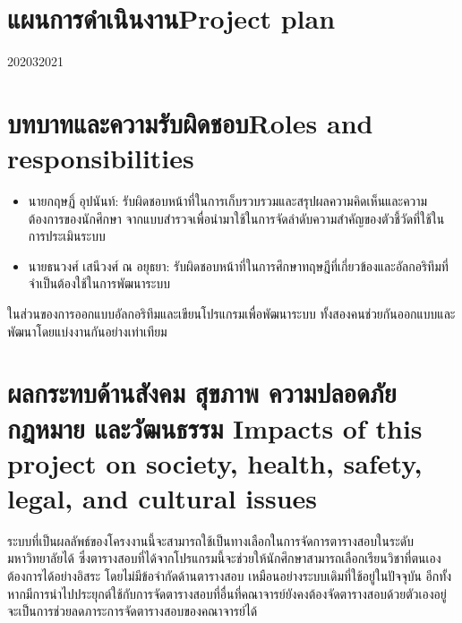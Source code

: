\section{\ifcpe แผนการดำเนินงาน\else Project plan\fi}

\begin{plan}{7}{2020}{3}{2021}
\end{plan}


\section{\ifcpe บทบาทและความรับผิดชอบ\else Roles and responsibilities\fi}
\begin{itemize}
\item นายกฤษฏิ์ อุปนันท์: รับผิดชอบหน้าที่ในการเก็บรวบรวมและสรุปผลความคิดเห็นและความต้องการของนักศึกษา
จากแบบสำรวจเพื่อนำมาใช้ในการจัดลำดับความสำคัญของตัวชี้วัดที่ใช้ในการประเมินระบบ
\item นายธนวงศ์ เสนีวงศ์ ณ อยุธยา: รับผิดชอบหน้าที่ในการศึกษาทฤษฎีที่เกี่ยวข้องและอัลกอริทึมที่จำเป็นต้องใช้ในการพัฒนาระบบ
\end{itemize}

ในส่วนของการออกแบบอัลกอริทึมและเขียนโปรแกรมเพื่อพัฒนาระบบ ทั้งสองคนช่วยกันออกแบบและพัฒนาโดยแบ่งงานกันอย่างเท่าเทียม

\section{\ifcpe%
ผลกระทบด้านสังคม สุขภาพ ความปลอดภัย กฎหมาย และวัฒนธรรม
\else%
Impacts of this project on society, health, safety, legal, and cultural issues
\fi}

ระบบที่เป็นผลลัพธ์ของโครงงานนี้จะสามารถใช้เป็นทางเลือกในการจัดการตารางสอบในระดับมหาวิทยาลัยได้
ซึ่งตารางสอบที่ได้จากโปรแกรมนี้จะช่วยให้นักศึกษาสามารถเลือกเรียนวิชาที่ตนเองต้องการได้อย่างอิสระ โดยไม่มีข้อจำกัดด้านตารางสอบ
เหมือนอย่างระบบเดิมที่ใช้อยู่ในปัจจุบัน อีกทั้งหากมีการนำไปประยุกต์ใช้กับการจัดตารางสอบที่อื่นที่คณาจารย์ยังคงต้องจัดตารางสอบด้วยตัวเองอยู่
จะเป็นการช่วยลดภาระการจัดตารางสอบของคณาจารย์ได้

